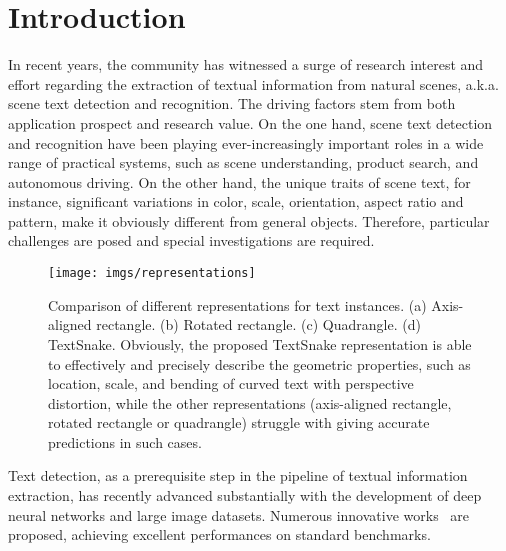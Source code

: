 \documentclass[runningheads]{llncs}
\begin{document}
\section{Introduction}

In recent years, the community has witnessed a surge of research interest and effort regarding the extraction of textual information from natural scenes, a.k.a. scene text detection and recognition. The driving factors stem from both application prospect and research value. On the one hand, scene text detection and recognition have been playing ever-increasingly important roles in a wide range of practical systems, such as scene understanding, product search, and autonomous driving. On the other hand, the unique traits of scene text, for instance, significant variations in color, scale, orientation, aspect ratio and pattern, make it obviously different from general objects. Therefore, particular challenges are posed and special investigations are required. 

\begin{figure*}
\begin{centering}
\vspace{-0mm}
\texttt{[image: imgs/representations]}
\par\end{centering}
\vspace{-5mm}
\caption{Comparison of different representations for text instances. (a) Axis-aligned rectangle. (b) Rotated rectangle. (c) Quadrangle. (d) TextSnake. Obviously, the proposed TextSnake representation is able to effectively and precisely describe the geometric properties, such as location, scale, and bending of curved text with perspective distortion, while the other representations (axis-aligned rectangle, rotated rectangle or quadrangle) struggle with giving accurate predictions in such cases.}   \label{fig:representations}
\vspace{-8mm}
\end{figure*}

Text detection, as a prerequisite step in the pipeline of textual information extraction, has recently advanced substantially with the development of deep neural networks and large image datasets. Numerous innovative works~\cite{yao2016scene,Shi_2017_CVPR,Zhou_2017_CVPR,liao2017textboxes,huang2015densebox,wu2017self,he2017multi,Hu_2017_ICCV,tian2017wetext,Lyu2018,ZhangAAAI2018} are proposed, achieving excellent performances on standard benchmarks.
\end{document}
